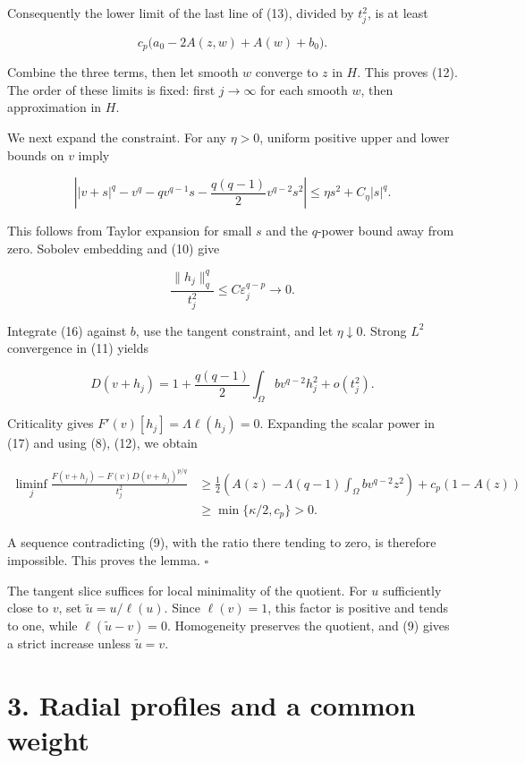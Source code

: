 \documentclass[11pt]{article}
\begin{document}
Consequently the lower limit of the last line of (13), divided by
\(t_j^2\), is at least

\[
c_p\bigl(a_0-2A(z,w)+A(w)+b_0\bigr).
\]

Combine the three terms, then let smooth \(w\) converge to \(z\) in
\(H\). This proves (12). The order of these limits is fixed: first
\(j\to\infty\) for each smooth \(w\), then approximation in \(H\).

We next expand the constraint. For any \(\eta>0\), uniform positive
upper and lower bounds on \(v\) imply

\[
\left||v+s|^q-v^q-qv^{q-1}s-\frac{q(q-1)}2v^{q-2}s^2\right|
\le\eta s^2+C_\eta|s|^q.
\tag{16}
\]

This follows from Taylor expansion for small \(s\) and the \(q\)-power
bound away from zero. Sobolev embedding and (10) give

\[
\frac{\|h_j\|_q^q}{t_j^2}\le C\varepsilon_j^{q-p}\longrightarrow0.
\]

Integrate (16) against \(b\), use the tangent constraint, and let
\(\eta\downarrow0\). Strong \(L^2\) convergence in (11) yields

\[
D(v+h_j)=1+\frac{q(q-1)}2\int_\Omega bv^{q-2}h_j^2+o(t_j^2).
\tag{17}
\]

Criticality gives \(F'(v)[h_j]=\Lambda\ell(h_j)=0\). Expanding the
scalar power in (17) and using (8), (12), we obtain

\[
\begin{aligned}
\liminf_j\frac{F(v+h_j)-F(v)D(v+h_j)^{p/q}}{t_j^2}
&\ge\frac12\left(A(z)-\Lambda(q-1)\int_\Omega bv^{q-2}z^2\right)
 +c_p(1-A(z))\\
&\ge\min\{\kappa/2,c_p\}>0.
\end{aligned}
\tag{18}
\]

A sequence contradicting (9), with the ratio there tending to zero, is
therefore impossible. This proves the lemma. \(\square\)

The tangent slice suffices for local minimality of the quotient. For
\(u\) sufficiently close to \(v\), set \(\widetilde u=u/\ell(u)\). Since
\(\ell(v)=1\), this factor is positive and tends to one, while
\(\ell(\widetilde u-v)=0\). Homogeneity preserves the quotient, and (9)
gives a strict increase unless \(\widetilde u=v\).

\section{3. Radial profiles and a common
weight}\label{radial-profiles-and-a-common-weight}
\end{document}

